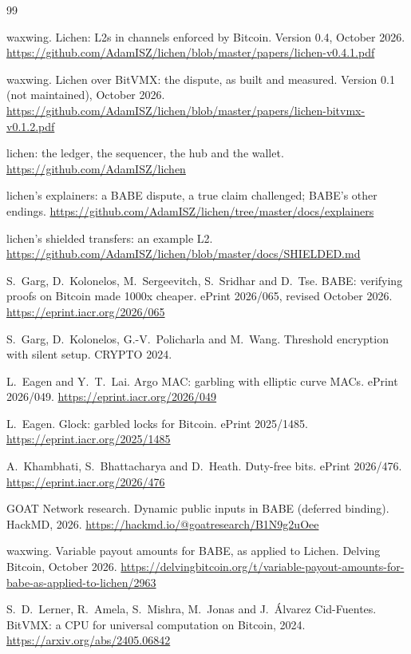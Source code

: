 \documentclass[11pt]{article}
\begin{document}
\begin{thebibliography}{99}

 waxwing. Lichen: L2s in channels enforced by Bitcoin. Version 0.4, October 2026. \url{https://github.com/AdamISZ/lichen/blob/master/papers/lichen-v0.4.1.pdf}

 waxwing. Lichen over BitVMX: the dispute, as built and measured. Version 0.1 (not maintained), October 2026. \url{https://github.com/AdamISZ/lichen/blob/master/papers/lichen-bitvmx-v0.1.2.pdf}

 lichen: the ledger, the sequencer, the hub and the wallet. \url{https://github.com/AdamISZ/lichen}

 lichen's explainers: a BABE dispute, a true claim challenged; BABE's other endings. \url{https://github.com/AdamISZ/lichen/tree/master/docs/explainers}

 lichen's shielded transfers: an example L2. \url{https://github.com/AdamISZ/lichen/blob/master/docs/SHIELDED.md}

 S.~Garg, D.~Kolonelos, M.~Sergeevitch, S.~Sridhar and D.~Tse. BABE: verifying proofs on Bitcoin made 1000x cheaper. ePrint 2026/065, revised October 2026. \url{https://eprint.iacr.org/2026/065}

 S.~Garg, D.~Kolonelos, G.-V.~Policharla and M.~Wang. Threshold encryption with silent setup. CRYPTO 2024.

 L.~Eagen and Y.~T.~Lai. Argo MAC: garbling with elliptic curve MACs. ePrint 2026/049. \url{https://eprint.iacr.org/2026/049}

 L.~Eagen. Glock: garbled locks for Bitcoin. ePrint 2025/1485. \url{https://eprint.iacr.org/2025/1485}

 A.~Khambhati, S.~Bhattacharya and D.~Heath. Duty-free bits. ePrint 2026/476. \url{https://eprint.iacr.org/2026/476}

 GOAT Network research. Dynamic public inputs in BABE (deferred binding). HackMD, 2026. \url{https://hackmd.io/@goatresearch/B1N9g2uOee}

 waxwing. Variable payout amounts for BABE, as applied to Lichen. Delving Bitcoin, October 2026. \url{https://delvingbitcoin.org/t/variable-payout-amounts-for-babe-as-applied-to-lichen/2963}

 S.~D.~Lerner, R.~Amela, S.~Mishra, M.~Jonas and J.~\'Alvarez Cid-Fuentes. BitVMX: a CPU for universal computation on Bitcoin, 2024. \url{https://arxiv.org/abs/2405.06842}


\end{thebibliography}
\end{document}
